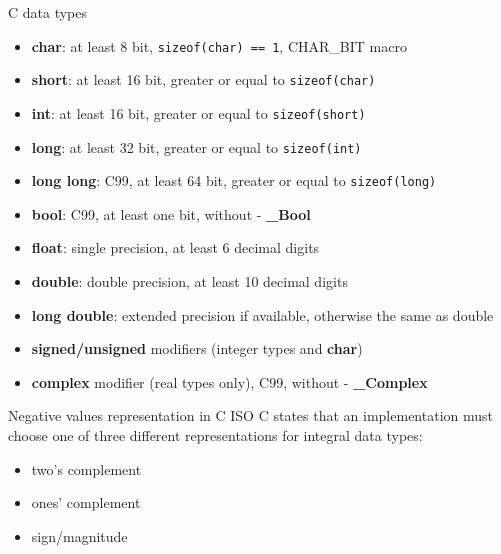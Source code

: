 \begin{frame}{C data types}
    \begin{itemize}
        \item \textbf{char}: at least 8 bit, \texttt{sizeof(char) == 1}, CHAR\_BIT macro
        \item \textbf{short}: at least 16 bit, greater or equal to \texttt{sizeof(char)}
        \item \textbf{int}: at least 16 bit, greater or equal to \texttt{sizeof(short)}
        \item \textbf{long}: at least 32 bit, greater or equal to \texttt{sizeof(int)}
        \item \textbf{long long}: C99, at least 64 bit, greater or equal to \texttt{sizeof(long)}
        \item \textbf{bool}: C99, at least one bit, without  - \textbf{\_Bool}
        \item \textbf{float}: single precision, at least 6 decimal digits
        \item \textbf{double}: double precision, at least 10 decimal digits
        \item \textbf{long double}: extended precision if available, otherwise the same as double
        \item \textbf{signed/unsigned} modifiers (integer types and \textbf{char})
        \item \textbf{complex} modifier (real types only), C99, without  - \textbf{\_Complex}
    \end{itemize}
\end{frame}
\begin{frame}{Negative values representation in C}
ISO C states that an implementation must choose one of three different representations for integral data types:
    \begin{itemize}
        \item two's complement
        \item ones' complement
        \item sign/magnitude
    \end{itemize}
\end{frame}
